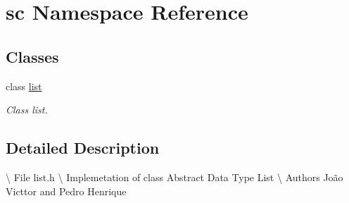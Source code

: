 \hypertarget{namespacesc}{}\section{sc Namespace Reference}
\label{namespacesc}
\subsection*{Classes}
\begin{DoxyCompactItemize}
\item 
class \hyperlink{classsc_1_1list}{list}
\begin{DoxyCompactList}\small\item\em Class list. \end{DoxyCompactList}\end{DoxyCompactItemize}


\subsection{Detailed Description}
\textbackslash{} File list.\+h \textbackslash{} Implemetation of class Abstract Data Type List \textbackslash{} Authors João Victtor and Pedro Henrique 